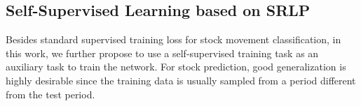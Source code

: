 \documentclass{article}
\begin{document}
\subsection{Self-Supervised Learning based on SRLP}
Besides standard supervised training loss for stock movement classification, in this work, we further propose to use a self-supervised training task as an auxiliary task to train the network. For stock prediction, good generalization is highly desirable since the training data is usually sampled from a period different from the test period.
\begin{table*}[t]
\centering
\caption{The stock movement classification performance(\%) of in-distribution evaluation on our scheme and others demonstrates the effectiveness of our self-supervised SRL method.  \CheckmarkBold \  indicates that the model adopted this Semantic role's pooling information.  \textbf{-} indicates that the method does not adopt this semantic role's pooling. \XSolidBrush \ indicates that semantic role's pooling is masked.}
\label{mainresult}
\end{table*}
\end{document}
